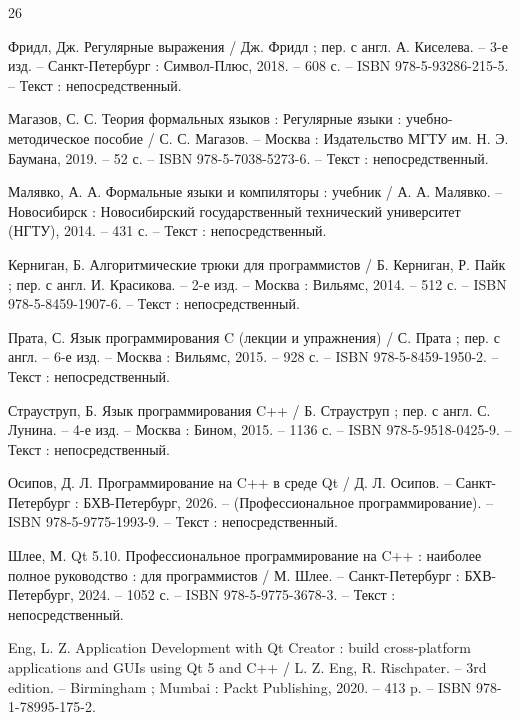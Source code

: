 %
\begin{thebibliography}{26}

	Фридл, Дж. Регулярные выражения / Дж. Фридл ; пер. с англ. А. Киселева. -- 3-е изд. -- Санкт-Петербург : Символ-Плюс, 2018. -- 608 с. -- ISBN 978-5-93286-215-5. -- Текст : непосредственный.
	
	Магазов, С. С. Теория формальных языков : Регулярные языки : учебно-методическое пособие / С. С. Магазов. -- Москва : Издательство МГТУ им. Н. Э. Баумана, 2019. -- 52 с. -- ISBN 978-5-7038-5273-6. -- Текст : непосредственный.
	
	Малявко, А. А. Формальные языки и компиляторы : учебник / А. А. Малявко. -- Новосибирск : Новосибирский государственный технический университет (НГТУ), 2014. -- 431 с. -- Текст : непосредственный.
	
	Керниган, Б. Алгоритмические трюки для программистов / Б. Керниган, Р. Пайк ; пер. с англ. И. Красикова. -- 2-е изд. -- Москва : Вильямс, 2014. -- 512 с. -- ISBN 978-5-8459-1907-6. -- Текст : непосредственный.
	
	Прата, С. Язык программирования C (лекции и упражнения) / С. Прата ; пер. с англ. -- 6-е изд. -- Москва : Вильямс, 2015. -- 928 с. -- ISBN 978-5-8459-1950-2. -- Текст : непосредственный.
	
	Страуструп, Б. Язык программирования C++ / Б. Страуструп ; пер. с англ. С. Лунина. -- 4-е изд. -- Москва : Бином, 2015. -- 1136 с. -- ISBN 978-5-9518-0425-9. -- Текст : непосредственный.
	
	Осипов, Д. Л. Программирование на C++ в среде Qt / Д. Л. Осипов. -- Санкт-Петербург : БХВ-Петербург, 2026. -- (Профессиональное программирование). -- ISBN 978-5-9775-1993-9. -- Текст : непосредственный.
	
	Шлее, М. Qt 5.10. Профессиональное программирование на C++ : наиболее полное руководство : для программистов / М. Шлее. -- Санкт-Петербург : БХВ-Петербург, 2024. -- 1052 с. -- ISBN 978-5-9775-3678-3. -- Текст : непосредственный.
	
	Eng, L. Z. Application Development with Qt Creator : build cross-platform applications and GUIs using Qt 5 and C++ / L. Z. Eng, R. Rischpater. -- 3rd edition. -- Birmingham ; Mumbai : Packt Publishing, 2020. -- 413 p. -- ISBN 978-1-78995-175-2.
	

\end{thebibliography}
